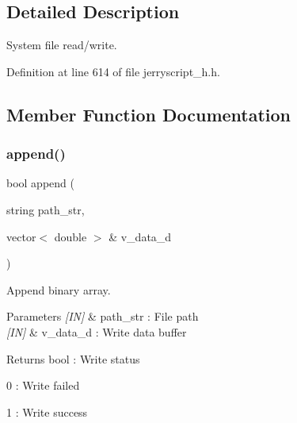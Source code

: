 \subsection{Detailed Description}
System file read/write. 

Definition at line 614 of file jerryscript\+\_\+h.\+h.



\subsection{Member Function Documentation}
\mbox{\label{classfile_a50fc19c821482a9181022aa5b506db46}} 
\subsubsection{append()\hspace{0.1cm}{\footnotesize\ttfamily [1/2]}}
{\footnotesize\ttfamily bool append (\begin{DoxyParamCaption}\item[{string}]{path\+\_\+str,  }\item[{vector$<$ double $>$ \&}]{v\+\_\+data\+\_\+d }\end{DoxyParamCaption})}



Append binary array. 


\begin{DoxyCode}{0}
\end{DoxyCode}



\begin{DoxyParams}{Parameters}
{\em \mbox{[}\+I\+N\mbox{]}} & path\+\_\+str \+: File path \\
\hline
{\em \mbox{[}\+I\+N\mbox{]}} & v\+\_\+data\+\_\+d \+: Write data buffer \\
\hline
\end{DoxyParams}
\begin{DoxyReturn}{Returns}
bool \+: Write status \begin{DoxyItemize}
\item 0 \+: Write failed \item 1 \+: Write success \end{DoxyItemize}

\end{DoxyReturn}
\mbox{\label{classfile_acbc04e63b90204ea300106e633edfff9}} 
